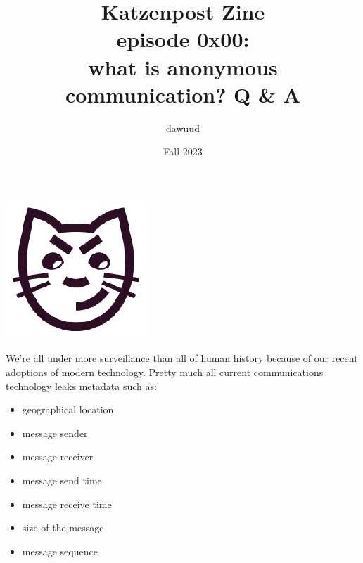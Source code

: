 \documentclass[statementpaper,oneside,article,14pt]{memoir}
\newcommand{\BackgroundPic}[1]{%
\put(0,0){%
\parbox[b][\paperheight]{\paperwidth}{%
\vfill
\centering
{\transparent{0.4} \texttt{[image: \#1]}}%
\vfill
}}}
\begin{document}

\title{Katzenpost Zine \\
  episode 0x00: \\
  what is anonymous communication? Q \& A }
\author{dawuud}
\date{Fall 2023}

\begingroup
\let\cleardoublepage\clearpage


\begin{titlingpage}
\maketitle

\begin{center}
  \includegraphics[scale=.2]{katzenpost_logo} \\
\end{center}

\end{titlingpage}

\endgroup




We're all under more surveillance than all of human history
because of our recent adoptions of modern technology.
Pretty much all current communications technology leaks metadata
such as:

\begin{itemize}
\item geographical location
\item message sender
\item message receiver
\item message send time
\item message receive time
\item size of the message
\item message sequence
\end{itemize}
\end{document}
